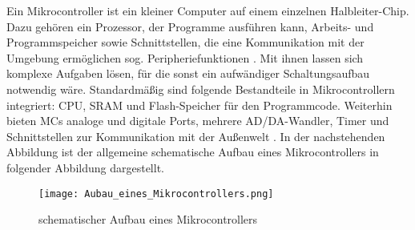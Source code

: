 Ein Mikrocontroller ist ein kleiner Computer auf einem einzelnen Halbleiter-Chip. Dazu gehören ein Prozessor,
der Programme ausführen kann, Arbeits- und Programmspeicher sowie Schnittstellen, die eine Kommunikation mit 
der Umgebung ermöglichen sog. Peripheriefunktionen \cite{Wikibooks:2014:Online}. Mit ihnen lassen sich komplexe
Aufgaben lösen, für die sonst ein aufwändiger Schaltungsaufbau notwendig wäre. Standardmäßig sind folgende Bestandteile in Mikrocontrollern integriert:
CPU, SRAM und Flash-Speicher für den Programmcode. Weiterhin bieten MCs analoge und digitale Ports, 
mehrere AD/DA-Wandler, Timer und Schnittstellen zur Kommunikation mit der Außenwelt \cite[vgl.]{Viktor:Seib:2014:Online}.
In der nachstehenden Abbildung ist der allgemeine schematische Aufbau eines Mikrocontrollers in folgender Abbildung dargestellt.
\begin{figure}[h!]
	\centering
		\texttt{[image: Aubau\_eines\_Mikrocontrollers.png]}
	\caption{schematischer Aufbau eines Mikrocontrollers \cite{habil:Ostermeye:2014:Online}}
	\label{Aufbau eines Mikrocontrollers}
\end{figure}

